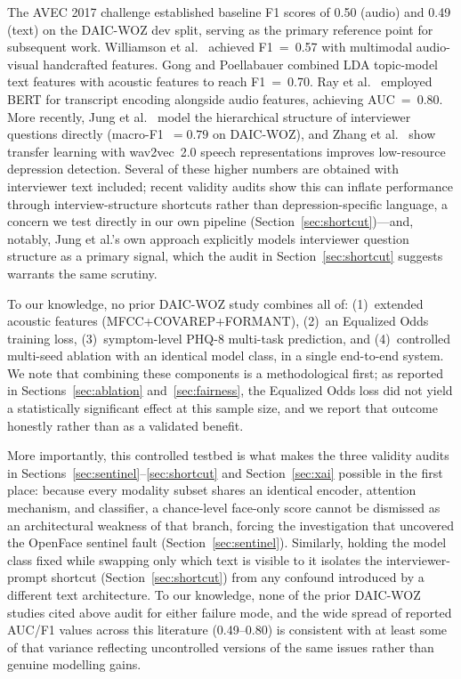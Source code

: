 \documentclass[journal]{IEEEtran}
\begin{document}
The AVEC 2017 challenge \cite{ringeval2017} established baseline F1
scores of 0.50 (audio) and 0.49 (text) on the DAIC-WOZ dev split,
serving as the primary reference point for subsequent work.
Williamson et al.\ \cite{williamson2016} achieved F1~=~0.57 with
multimodal audio-visual handcrafted features. Gong and Poellabauer
\cite{gong2017} combined LDA topic-model text features with acoustic
features to reach F1~=~0.70. Ray et al.\ \cite{ray2019} employed
BERT for transcript encoding alongside audio features, achieving
AUC~=~0.80. More recently, Jung et al.\ \cite{jung2024hique} model
the hierarchical structure of interviewer questions directly
(macro-F1~$=0.79$ on DAIC-WOZ), and Zhang et al.\
\cite{zhang2024wav2vec} show transfer learning with wav2vec~2.0
speech representations improves low-resource depression detection.
Several
of these higher numbers are obtained with interviewer text included;
recent validity audits \cite{burdisso2024therapist,patapati2025invalid}
show this can inflate performance through interview-structure
shortcuts rather than depression-specific language, a concern we
test directly in our own pipeline (Section~\ref{sec:shortcut})---and,
notably, Jung et al.'s own approach explicitly models interviewer
question structure as a primary signal, which the audit in
Section~\ref{sec:shortcut} suggests warrants the same scrutiny.

To our knowledge, no prior DAIC-WOZ study combines all of: (1)~extended
acoustic features (MFCC+COVAREP+FORMANT), (2)~an Equalized Odds
training loss, (3)~symptom-level PHQ-8 multi-task prediction, and
(4)~controlled multi-seed ablation with an identical model class, in a
single end-to-end system. We note that combining these components is
a methodological first; as reported in Sections~\ref{sec:ablation}
and~\ref{sec:fairness}, the Equalized Odds loss did not yield a
statistically significant effect at this sample size, and we report
that outcome honestly rather than as a validated benefit.

More importantly, this controlled testbed is what makes the three
validity audits in Sections~\ref{sec:sentinel}--\ref{sec:shortcut} and
Section~\ref{sec:xai} possible in the first place: because every
modality subset shares an identical encoder, attention mechanism, and
classifier, a chance-level face-only score cannot be dismissed as an
architectural weakness of that branch, forcing the investigation that
uncovered the OpenFace sentinel fault
(Section~\ref{sec:sentinel}). Similarly, holding the model class fixed
while swapping only which text is visible to it isolates the
interviewer-prompt shortcut (Section~\ref{sec:shortcut}) from any
confound introduced by a different text architecture. To our
knowledge, none of the prior DAIC-WOZ studies cited above audit for
either failure mode, and the wide spread of reported AUC/F1 values
across this literature (0.49--0.80) is consistent with at least some
of that variance reflecting uncontrolled versions of the same issues
rather than genuine modelling gains.
\end{document}
